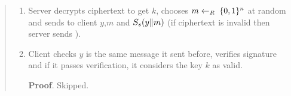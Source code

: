 \documentclass{article}
\begin{document}
\begin{quote}
\begin{enumerate}
\item{}
Server decrypts ciphertext to get $k$, chooses $m\leftarrow_R\; \{0,1\}^n$ at random  and sends to client $y$,$m$ and $S_s(y\| m)$ (if ciphertext is invalid then server sends ).%

\item{}
Client checks $y$ is the same message it sent before, verifies signature and if it passes verification, it   considers the key $k$ as valid.%

\begin{mdbmarginx}{1ex}{0pt}{1ex}{0pt}%
\noindent{}\textbf{Proof}.  Skipped.%
\end{mdbmarginx}%
\end{enumerate}%
\end{quote}%
\end{document}
